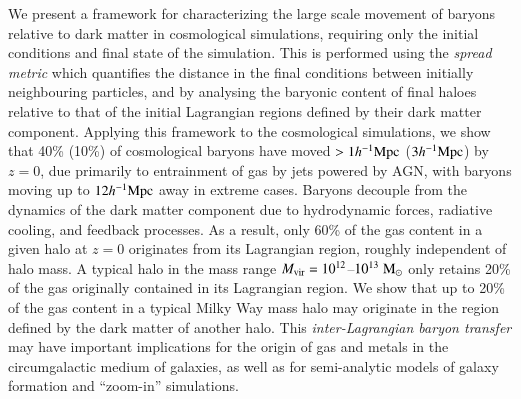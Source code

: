 We present a framework for characterizing the large scale movement of baryons
relative to dark matter in cosmological simulations, requiring only the
initial conditions and final state of the simulation. This is performed using
the {\it spread metric} which quantifies the distance in the final conditions
between initially neighbouring particles, and by analysing the baryonic
content of final haloes relative to that of the initial Lagrangian regions
defined by their dark matter component. Applying this framework to the
\simba{} cosmological simulations, we show that 40\% (10\%) of cosmological
baryons have moved $> 1h^{-1}{\rm Mpc}{}$ ($3h^{-1}{\rm Mpc}{}$) by $z=0$, due primarily to
entrainment of gas by jets powered by AGN, with baryons moving up to
$12h^{-1}{\rm Mpc}{}$ away in extreme cases. Baryons
decouple from the dynamics of the dark matter component due to hydrodynamic
forces, radiative cooling, and feedback processes. As a result, only 60\% of
the gas content in a given halo at $z=0$ originates from its Lagrangian
region, roughly independent of halo mass. A typical halo in the mass range
$M_{\rm vir} = 10^{12}$--$10^{13}\;{\rm M}_{\odot}$ only retains 20\% of the gas
originally contained in its Lagrangian region. We show that up to 20\% of the
gas content in a typical Milky Way mass halo may originate in the region
defined by the dark matter of another halo. This {\it inter-Lagrangian baryon
transfer} may have important implications for the origin of gas and metals in
the circumgalactic medium of galaxies, as well as for semi-analytic models of
galaxy formation and ``zoom-in'' simulations.